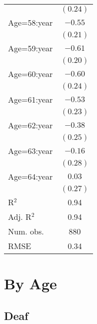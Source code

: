 \documentclass[fullpage]{paper}
\begin{document}
\begin{center}
\begin{longtable}{l c }
            & $(0.24)$ \\
Age=58:year & $-0.55$  \\
            & $(0.21)$ \\
Age=59:year & $-0.61$  \\
            & $(0.20)$ \\
Age=60:year & $-0.60$  \\
            & $(0.24)$ \\
Age=61:year & $-0.53$  \\
            & $(0.23)$ \\
Age=62:year & $-0.38$  \\
            & $(0.25)$ \\
Age=63:year & $-0.16$  \\
            & $(0.28)$ \\
Age=64:year & $0.03$   \\
            & $(0.27)$ \\
\hline
R$^2$       & 0.94     \\
Adj. R$^2$  & 0.94     \\
Num. obs.   & 880      \\
RMSE        & 0.34     \\
\end{longtable}
\end{center}
\section{ By Age }

\subsection{ Deaf }
\end{document}
